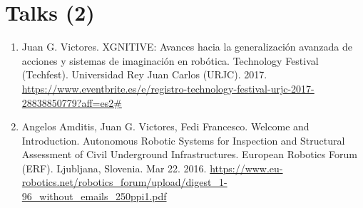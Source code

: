 \documentclass{article}
\begin{document}
\section*{Talks (2)}
\begin{enumerate}
\item Juan G. Victores. XGNITIVE: Avances hacia la generalización avanzada de acciones y sistemas de imaginación en robótica. Technology Festival (Techfest). Universidad Rey Juan Carlos (URJC). 2017. \url{https://www.eventbrite.es/e/registro-technology-festival-urjc-2017-28838850779?aff=es2#}
\item Angelos Amditis, Juan G. Victores, Fedi Francesco. Welcome and Introduction. Autonomous Robotic Systems for Inspection and Structural Assessment of Civil Underground Infrastructures. European Robotics Forum (ERF). Ljubljana, Slovenia. Mar 22. 2016. \url{https://www.eu-robotics.net/robotics\_forum/upload/digest\_1-96\_without\_emails\_250ppi1.pdf}
\end{enumerate}
\end{document}

